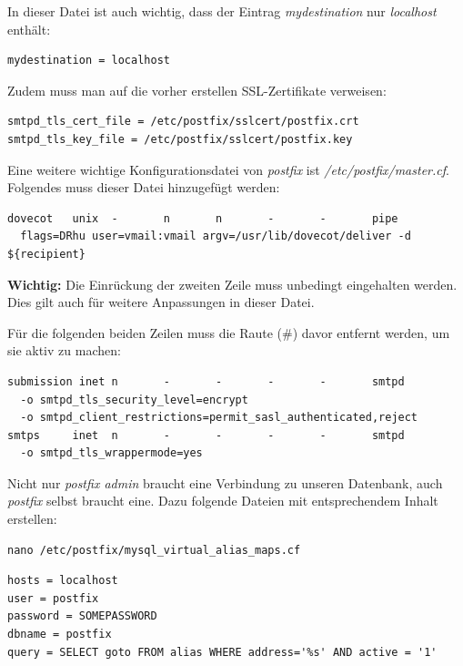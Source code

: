 \newpage
In dieser Datei ist auch wichtig, dass der Eintrag \textit{mydestination} nur \textit{localhost} enthält:
\begin{lstlisting}
mydestination = localhost
\end{lstlisting}

Zudem muss man auf die vorher erstellen SSL-Zertifikate verweisen:

\begin{lstlisting}
smtpd_tls_cert_file = /etc/postfix/sslcert/postfix.crt
smtpd_tls_key_file = /etc/postfix/sslcert/postfix.key
\end{lstlisting}

Eine weitere wichtige Konfigurationsdatei von \textit{postfix} ist \textit{/etc/postfix/master.cf}. \\
Folgendes muss dieser Datei hinzugefügt werden:

\begin{lstlisting}
dovecot   unix  -       n       n       -       -       pipe
  flags=DRhu user=vmail:vmail argv=/usr/lib/dovecot/deliver -d ${recipient}
\end{lstlisting}

\textbf{Wichtig:} Die Einrückung der zweiten Zeile muss unbedingt eingehalten werden. Dies gilt auch für weitere Anpassungen in dieser Datei.

Für die folgenden beiden Zeilen muss die Raute (\#) davor entfernt werden, um sie aktiv zu machen:

\begin{lstlisting}
submission inet n       -       -       -       -       smtpd
  -o smtpd_tls_security_level=encrypt
  -o smtpd_client_restrictions=permit_sasl_authenticated,reject
smtps     inet  n       -       -       -       -       smtpd
  -o smtpd_tls_wrappermode=yes
\end{lstlisting}


Nicht nur \textit{postfix admin} braucht eine Verbindung zu unseren Datenbank, auch \textit{postfix} selbst braucht eine. Dazu folgende Dateien mit entsprechendem Inhalt erstellen:

\begin{lstlisting}
nano /etc/postfix/mysql_virtual_alias_maps.cf
\end{lstlisting}

\begin{lstlisting}
hosts = localhost
user = postfix
password = SOMEPASSWORD
dbname = postfix
query = SELECT goto FROM alias WHERE address='%s' AND active = '1'
\end{lstlisting}

